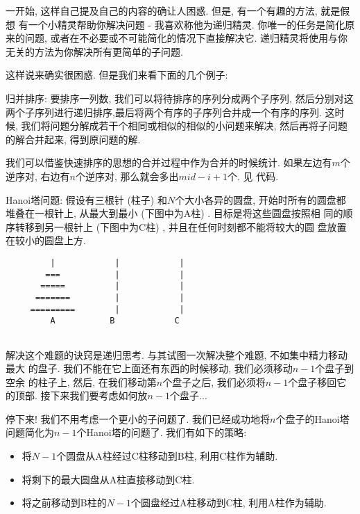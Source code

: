一开始, 这样自己提及自己的内容的确让人困惑. 但是, 有一个有趣的方法, 就是假想
有一个小精灵帮助你解决问题 - 我喜欢称他为递归精灵. 
你唯一的任务是简化原来的问题, 或者在不必要或不可能简化的情况下直接解决它. 
递归精灵将使用与你无关的方法为你解决所有更简单的子问题. 

这样说来确实很困惑. 但是我们来看下面的几个例子: 

\begin{example}
    归并排序: 要排序一列数, 我们可以将待排序的序列分成两个子序列,
    然后分别对这两个子序列进行递归排序,最后将两个有序的子序列合并成一个有序的序列.
    这时候, 我们将问题分解成若干个相同或相似的相似的小问题来解决, 
    然后再将子问题的解合并起来, 得到原问题的解. 
\end{example}

 我们可以借鉴快速排序的思想的合并过程中作为合并的时候统计. 
如果左边有$m$个逆序对, 右边有$n$个逆序对, 那么就会多出$mid-i+1$个. 见
代码. 

\begin{example}
    Hanoi塔问题: 假设有三根针 (柱子) 和$N$个大小各异的圆盘, 开始时所有的圆盘都
    堆叠在一根针上, 从最大到最小 (下图中为A柱) . 目标是将这些圆盘按照相
    同的顺序转移到另一根针上 (下图中为C柱) , 并且在任何时刻都不能将较大的圆
    盘放置在较小的圆盘上方. 
    \begin{lstlisting}
         |            |            |
        ===           |            |
       =====          |            |
      =======         |            |
     =========        |            |
         A           B            C
    
    \end{lstlisting}
\end{example}

解决这个难题的诀窍是递归思考. 与其试图一次解决整个难题, 不如集中精力移动最大
的盘子. 我们不能在它上面还有东西的时候移动, 我们必须移动$n-1$个盘子到空余
的柱子上, 然后, 在我们移动第$n$个盘子之后, 我们必须将$n-1$个盘子移回它的顶部. 
接下来我们要考虑如何放$n-1$个盘子... 

停下来! 我们不用考虑一个更小的子问题了. 我们已经成功地将$n$个盘子的Hanoi塔
问题简化为$n-1$个Hanoi塔的问题了. 我们有如下的策略: 
\begin{itemize}[noitemsep]
    \item 将$N-1$个圆盘从A柱经过C柱移动到B柱, 利用C柱作为辅助. 
    \item 将剩下的最大圆盘从A柱直接移动到C柱. 
    \item 将之前移动到B柱的$N-1$个圆盘经过A柱移动到C柱, 利用A柱作为辅助. 
\end{itemize} 


